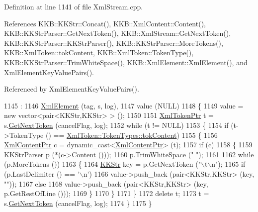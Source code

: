 Definition at line 1141 of file Xml\+Stream.\+cpp.



References K\+K\+B\+::\+K\+K\+Str\+::\+Concat(), K\+K\+B\+::\+Xml\+Content\+::\+Content(), K\+K\+B\+::\+K\+K\+Str\+Parser\+::\+Get\+Next\+Token(), K\+K\+B\+::\+Xml\+Stream\+::\+Get\+Next\+Token(), K\+K\+B\+::\+K\+K\+Str\+Parser\+::\+K\+K\+Str\+Parser(), K\+K\+B\+::\+K\+K\+Str\+Parser\+::\+More\+Tokens(), K\+K\+B\+::\+Xml\+Token\+::tok\+Content, K\+K\+B\+::\+Xml\+Token\+::\+Token\+Type(), K\+K\+B\+::\+K\+K\+Str\+Parser\+::\+Trim\+White\+Space(), K\+K\+B\+::\+Xml\+Element\+::\+Xml\+Element(), and Xml\+Element\+Key\+Value\+Pairs().



Referenced by Xml\+Element\+Key\+Value\+Pairs().


\begin{DoxyCode}
1145                                                   :
1146     \hyperlink{class_k_k_b_1_1_xml_element_a66317eff5bd3abcc60755756ba2887d5}{XmlElement} (tag, s, log),
1147     value (NULL)
1148 \{
1149   value = \textcolor{keyword}{new} vector<pair<KKStr,KKStr> > ();
1150 
1151   \hyperlink{class_k_k_b_1_1_xml_token}{XmlTokenPtr} t = s.\hyperlink{class_k_k_b_1_1_xml_stream_a87cc738b05c666cf5d5c25beaab477b4}{GetNextToken} (cancelFlag, log);
1152   \textcolor{keywordflow}{while}  (t != NULL)
1153   \{
1154     \textcolor{keywordflow}{if}  (t->TokenType () == \hyperlink{class_k_k_b_1_1_xml_token_a18b6e90c919f4b92e3b024f50f247f62aff369b5479984ca659548f37ad4caec9}{XmlToken::TokenTypes::tokContent})
1155     \{
1156       \hyperlink{class_k_k_b_1_1_xml_content}{XmlContentPtr} c = \textcolor{keyword}{dynamic\_cast<}\hyperlink{class_k_k_b_1_1_xml_content}{XmlContentPtr}\textcolor{keyword}{>} (t);
1157       \textcolor{keywordflow}{if}  (c)
1158       \{
1159         \hyperlink{class_k_k_b_1_1_k_k_str_parser}{KKStrParser} p (*(c->\hyperlink{class_k_k_b_1_1_xml_content_a1d0730aae45b069e8604bef19b8c0098}{Content} ()));
1160         p.TrimWhiteSpace (\textcolor{stringliteral}{" "});
1161         
1162         \textcolor{keywordflow}{while}  (p.MoreTokens ())
1163         \{
1164           \hyperlink{class_k_k_b_1_1_k_k_str}{KKStr}  key = p.GetNextToken (\textcolor{stringliteral}{"\(\backslash\)t\(\backslash\)n"});
1165           \textcolor{keywordflow}{if}  (p.LastDelimiter () == \textcolor{charliteral}{'\(\backslash\)n'})
1166             value->push\_back (pair<KKStr,KKStr> (key, \textcolor{stringliteral}{""}));
1167           \textcolor{keywordflow}{else}
1168             value->push\_back (pair<KKStr,KKStr> (key, p.GetRestOfLine ()));
1169         \}
1170       \}
1171     \}
1172     \textcolor{keyword}{delete}  t;
1173     t = s.\hyperlink{class_k_k_b_1_1_xml_stream_a87cc738b05c666cf5d5c25beaab477b4}{GetNextToken} (cancelFlag, log);
1174   \}
1175 \}
\end{DoxyCode}
